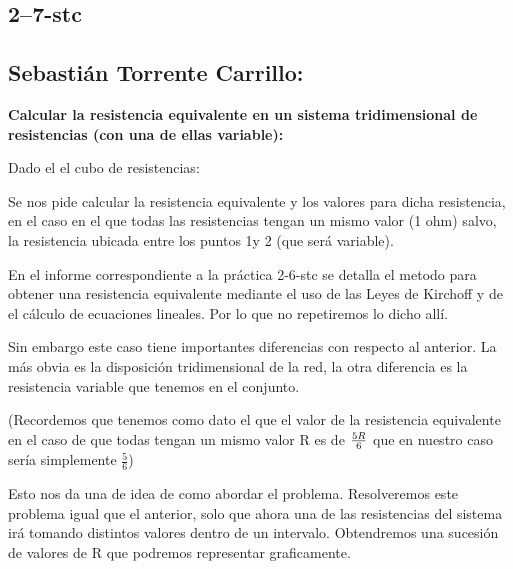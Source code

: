 \documentclass[12pt,thmsa]{article}
\begin{document}
\subsection{2--7-stc}

\subsection{Sebasti\'{a}n Torrente Carrillo:}

\vspace{1pt}\textbf{Calcular la resistencia equivalente en un sistema
tridimensional de resistencias (con una de ellas variable):}

Dado el el cubo de resistencias:

\begin{center}
\end{center}

Se nos pide calcular la resistencia equivalente y los valores para dicha
resistencia, en el caso en el que todas las resistencias tengan un mismo
valor (1 ohm) salvo, la resistencia ubicada entre los puntos 1y 2 (que
ser\'{a} variable).

En el informe correspondiente a la pr\'{a}ctica 2-6-stc se detalla el metodo
para obtener una resistencia equivalente mediante el uso de las Leyes de
Kirchoff y de el c\'{a}lculo de ecuaciones lineales. Por lo que no
repetiremos lo dicho all\'{i}.

Sin embargo este caso tiene importantes diferencias con respecto al
anterior. La m\'{a}s obvia es la disposici\'{o}n tridimensional de la red,
la otra diferencia es la resistencia variable que tenemos en el conjunto.

(Recordemos que tenemos como dato el que el valor de la resistencia
equivalente en el caso de que todas tengan un mismo valor R es de $\frac{5R}{%
6}$ que en nuestro caso ser\'{i}a simplemente $\frac{5}{6}$)

Esto nos da una de idea de como abordar el problema. Resolveremos este
problema igual que el anterior, solo que ahora una de las resistencias del
sistema ir\'{a} tomando distintos valores dentro de un intervalo.
Obtendremos una sucesi\'{o}n de valores de R que podremos representar
graficamente.
\end{document}

